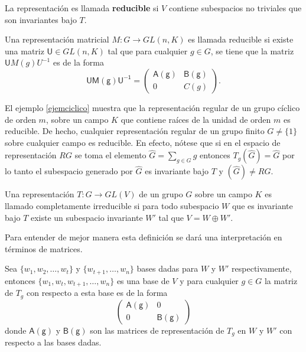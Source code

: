 La representación es llamada \textbf{reducible} si $V$ contiene  subespacios no triviales que son invariantes bajo $T$. 

\begin{definicion}
Una representación matricial $M \colon G \to GL(n,K)$ es llamada reducible si existe una matriz $\mathsf{U} \in GL(n,K)$ tal que para cualquier $g \in G$, se tiene que la matriz $\mathsf{U}M(g)U^{-1}$ es de la forma
\begin{equation*}
\mathsf{UM(g)U^{-1}} = \begin{pmatrix}
\mathsf{A(g)} & \mathsf{B(g)} \\
0 & C(g)
\end{pmatrix}. 
\end{equation*}  
\end{definicion}

El ejemplo \ref{ejemciclico} muestra que la representación regular de un grupo cíclico de orden $m$, sobre un campo $K$ que contiene raíces de la unidad de orden $m$ es reducible. De hecho, cualquier representación regular de un grupo finito $G \neq \{ 1 \}$ sobre cualquier campo es reducible. En efecto, nótese que si en el espacio de representación $RG$ se toma el elemento $\hat{G} = \sum_{g \in G}g$ entonces $ T_g(\hat{G}) = \hat{G}$ por lo tanto el subespacio generado por $\hat{G}$ es invariante bajo $T$ y $(\hat{G}) \neq RG.$  

\begin{definicion}
Una representación $T \colon G \to GL(V)$ de un grupo $G$ sobre un campo $K$ es llamado completamente irreducible si para todo subespacio $W$ que es invariante bajo $T$ existe un subespacio invariante $W'$ tal que $V = W \oplus W'$.
\end{definicion}
Para entender de mejor manera esta definición se dará una interpretación en términos de matrices.

Sea $\{ w_1, w_2, \dots, w_t \}$ y $\{ w_{t+1}, \dots, w_n\}$ bases dadas para $W$ y $W'$ respectivamente, entonces $\{ w_1, w_t, w_{t+1}, \dots, w_n \}$ es una base de $V$ y para cualquier $g \in G$ la matriz de $T_g$ con respecto a esta base es de la forma
\begin{equation*} \begin{pmatrix}
\mathsf{A(g)} & 0 \\
0 & \mathsf{B(g)}
\end{pmatrix} \end{equation*} donde $\mathsf{A(g)}$ y $\mathsf{B(g)}$ son las matrices de representación de $T_g$ en $W$ y $W'$ con respecto a las bases dadas. 

